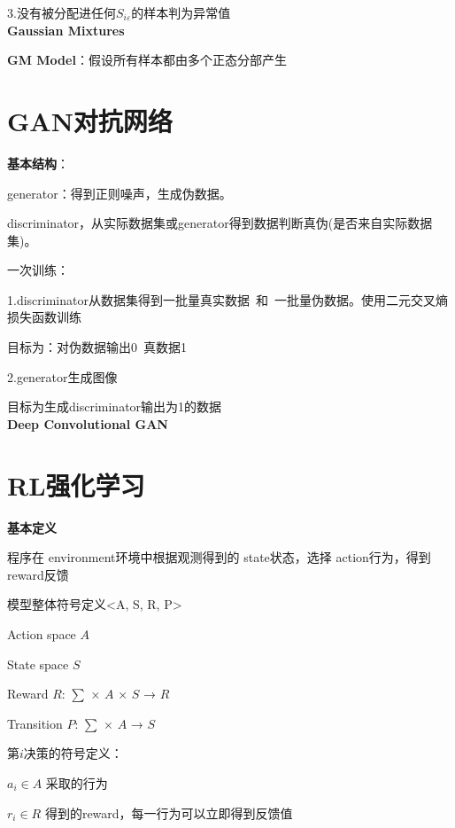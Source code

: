 \documentclass[UTF8]{ctexart}
\begin{document}
  \quad 3.没有被分配进任何$S_{i\varepsilon }$的样本判为异常值\\
\textbf{Gaussian Mixtures}

  \textbf{GM Model}：假设所有样本都由多个正态分部产生


\section{GAN对抗网络}
\noindent \textbf{基本结构}：

  generator：得到正则噪声，生成伪数据。
  
  discriminator，从实际数据集或generator得到数据判断真伪(是否来自实际数据集)。

  一次训练：

  \quad 1.discriminator从数据集得到一批量真实数据\ 和\ 一批量伪数据。使用二元交叉熵损失函数训练

  \quad \quad 目标为：对伪数据输出0\ 真数据1

  \quad 2.generator生成图像
  
  \quad \quad 目标为生成discriminator输出为1的数据\\
\textbf{Deep Convolutional GAN}


\section{RL强化学习}
\noindent \textbf{基本定义}

  程序在 environment环境中根据观测得到的 state状态，选择 action行为，得到reward反馈

  模型整体符号定义<A, S, R, P>

  \quad Action space $A$
  
  \quad State space $S$
  
  \quad Reward $R$: $\sum$ × $A$ × $S$ → $R$
  
  \quad Transition $P$: $\sum$ × $A$ → $S$

  第$i$决策的符号定义：

  \quad $a_i \in A$ 采取的行为

  \quad $r_i \in R$ 得到的reward，每一行为可以立即得到反馈值
  
\end{document}
